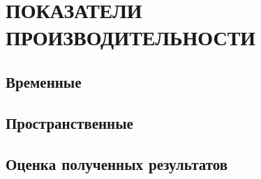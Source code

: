 \chapter{ПОКАЗАТЕЛИ ПРОИЗВОДИТЕЛЬНОСТИ}

\section{Временные}
\section{Пространственные}
\section{Оценка полученных результатов}
